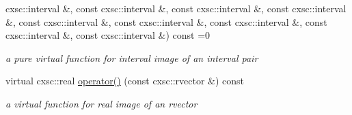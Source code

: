 \begin{DoxyCompactItemize}
cxsc\-::interval \&, const cxsc\-::interval \&, const cxsc\-::interval \&, const cxsc\-::interval \&, const cxsc\-::interval \&, const cxsc\-::interval \&, const cxsc\-::interval \&, const cxsc\-::interval \&, const cxsc\-::interval \&) const =0
\begin{DoxyCompactList}\small\item\em a pure virtual function for interval image of an interval pair \end{DoxyCompactList}\item 
virtual cxsc\-::real \hyperlink{classsubpavings_1_1MappedFobj100D_a85c7b43d20d5793676de4b1ff5f242d6}{operator()} (const cxsc\-::rvector \&) const 
\begin{DoxyCompactList}\small\item\em a virtual function for real image of an rvector \end{DoxyCompactList}\item 

\end{DoxyCompactItemize}

